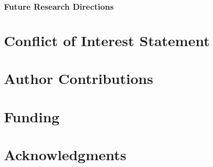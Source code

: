 \documentclass[manuscript,screen,review]{acmart}
\begin{document}


\subsubsection{Future Research Directions} 

\section*{Conflict of Interest Statement}

\section*{Author Contributions}

\section*{Funding}

\section*{Acknowledgments}




\end{document}
